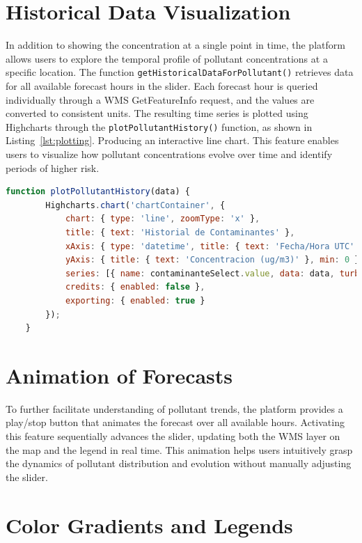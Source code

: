 \section{Historical Data Visualization}
In addition to showing the concentration at a single point in time, the platform allows users to explore the temporal profile of pollutant concentrations at a specific location. The function \texttt{getHistoricalDataForPollutant()} retrieves data for all available forecast hours in the slider. Each forecast hour is queried individually through a WMS GetFeatureInfo request, and the values are converted to consistent units. The resulting time series is plotted using Highcharts through the \texttt{plotPollutantHistory()} function, as shown in Listing~\ref{lst:plotting}. Producing an interactive line chart. This feature enables users to visualize how pollutant concentrations evolve over time and identify periods of higher risk.


\begin{lstlisting}[language=JavaScript, caption={Plotting historical pollutant data using Highcharts}, label={lst:plotting}]
	function plotPollutantHistory(data) {
		Highcharts.chart('chartContainer', {
			chart: { type: 'line', zoomType: 'x' },
			title: { text: 'Historial de Contaminantes' },
			xAxis: { type: 'datetime', title: { text: 'Fecha/Hora UTC' } },
			yAxis: { title: { text: 'Concentracion (ug/m3)' }, min: 0 },
			series: [{ name: contaminanteSelect.value, data: data, turboThreshold: 0 }],
			credits: { enabled: false },
			exporting: { enabled: true }
		});
	}
\end{lstlisting}

\section{Animation of Forecasts}

To further facilitate understanding of pollutant trends, the platform provides a play/stop button that animates the forecast over all available hours. Activating this feature sequentially advances the slider, updating both the WMS layer on the map and the legend in real time. This animation helps users intuitively grasp the dynamics of pollutant distribution and evolution without manually adjusting the slider.

\section{Color Gradients and Legends}

